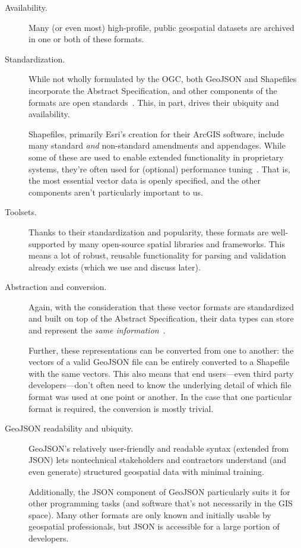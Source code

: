 \begin{description}
  \item[Availability.] Many (or even most) high-profile, public geospatial datasets are archived in one or both of these formats.
  \item[Standardization.] While not wholly formulated by the OGC, both GeoJSON and Shapefiles incorporate the Abstract Specification, and other components of the formats are open standards~\cite{Environ1998,GeoJSON}. This, in part, drives their ubiquity and availability.
  
Shapefiles, primarily Esri's creation for their ArcGIS software, include many standard \textit{and} non-standard amendments and appendages. While some of these are used to enable extended functionality in proprietary systems, they're often used for (optional) performance tuning~\cite{Environ1998}. That is, the most essential vector data is openly specified, and the other components aren't particularly important to us.

\item[Toolsets.] Thanks to their standardization and popularity, these formats  are well-supported by many open-source spatial libraries and frameworks. This means a lot of robust, reusable functionality for parsing and validation already exists (which we use and discuss later).

\item[Abstraction and conversion.] Again, with the consideration that these vector formats are standardized and built on top of the Abstract Specification, their data types can store and represent the \textit{same information}~\cite{AbstractSpecFaq}.

Further, these representations can be converted from one to another: the vectors of a valid GeoJSON file can be entirely converted to a Shapefile with the same vectors. This also means that end users---even third party developers---don't often need to know the underlying detail of which file format was used at one point or another. In the case that one particular format is required, the conversion is mostly trivial.

\item[GeoJSON readability and ubiquity.] GeoJSON's relatively user-friendly and readable syntax (extended from JSON) lets nontechnical stakeholders and contractors understand (and even generate) structured geospatial data with minimal training.

Additionally, the JSON component of GeoJSON particularly suits it for other programming tasks (and software that's not necessarily in the GIS space). Many other formats are only known and initially usable by geospatial professionals, but JSON is accessible for a large portion of developers.

\end{description}

